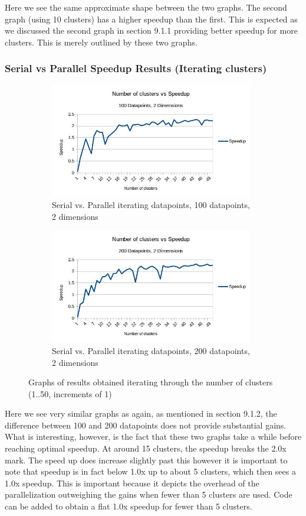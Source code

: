 \documentclass{article}
\begin{document}
Here we see the same approximate shape between the two graphs. The second graph (using 10 clusters) has a higher speedup than the first. This is expected as we discussed the second graph in section 9.1.1 providing better speedup for more clusters. This is merely outlined by these two graphs. 

\newpage
\subsubsection{Serial vs Parallel Speedup Results (Iterating clusters)}
\begin{figure}[h!]
    \begin{subfigure}{0.5\textwidth}
        \includegraphics[width=0.9\linewidth, height=5cm]{Pictures/clusters1_Speedup.jpg}
        \caption{Serial vs. Parallel iterating datapoints, 100 datapoints, 2 dimensions}
    \end{subfigure}
    \begin{subfigure}{0.5\textwidth}
        \includegraphics[width=0.9\linewidth, height=5cm]{Pictures/clusters2_Speedup.jpg}
        \caption{Serial vs. Parallel iterating datapoints, 200 datapoints, 2 dimensions}
    \end{subfigure}
\caption{Graphs of results obtained iterating through the number of clusters (1..50, increments of 1)}
\end{figure}

Here we see very similar graphs as again, as mentioned in section 9.1.2, the difference between 100 and 200 datapoints does not provide substantial gains. What is interesting, however, is the fact that these two graphs take a while before reaching optimal speedup. At around 15 clusters, the speedup breaks the 2.0x mark. The speed up does increase slightly past this however it is important to note that speedup is in fact below 1.0x up to about 5 clusters, which then sees a 1.0x speedup. This is important because it depicts the overhead of the parallelization outweighing the gains when fewer than 5 clusters are used. Code can be added to obtain a flat 1.0x speedup for fewer than 5 clusters.
\end{document}
